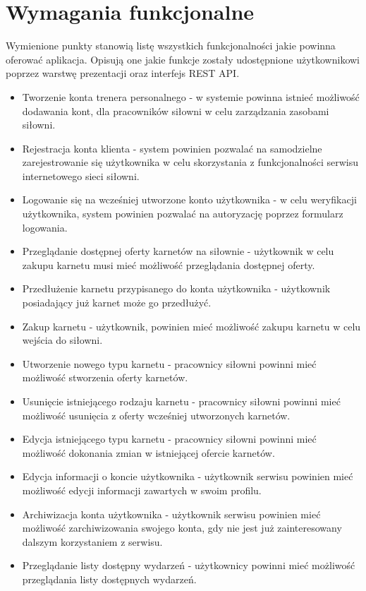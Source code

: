 \documentclass[a4paper,twoside,12pt]{book}
\begin{document}
	\section{Wymagania funkcjonalne} 
	Wymienione punkty stanowią listę wszystkich funkcjonalności jakie powinna oferować aplikacja. Opisują one jakie funkcje  zostały udostępnione użytkownikowi poprzez warstwę prezentacji oraz interfejs REST API.
		\begin{itemize}
			\item Tworzenie konta trenera personalnego - w systemie powinna istnieć możliwość dodawania kont, dla pracowników siłowni w celu zarządzania zasobami siłowni.
			\item Rejestracja konta klienta - system powinien pozwalać na samodzielne zarejestrowanie się użytkownika w celu skorzystania z funkcjonalności serwisu internetowego sieci siłowni.
			\item Logowanie się na wcześniej utworzone konto użytkownika - w celu weryfikacji użytkownika, system powinien pozwalać na autoryzację poprzez formularz logowania.
			\item Przeglądanie dostępnej oferty karnetów na siłownie - użytkownik w celu zakupu karnetu musi mieć możliwość przeglądania dostępnej oferty.
			\item Przedłużenie karnetu przypisanego do konta użytkownika - użytkownik posiadający już karnet może go przedłużyć.
			\item Zakup karnetu - użytkownik, powinien mieć możliwość zakupu karnetu w celu wejścia do siłowni.
			\item Utworzenie nowego typu karnetu - pracownicy siłowni powinni mieć możliwość stworzenia oferty karnetów.
			\item Usunięcie istniejącego rodzaju karnetu - pracownicy siłowni powinni mieć możliwość usunięcia z oferty wcześniej utworzonych karnetów.
			\item Edycja istniejącego typu karnetu - pracownicy siłowni powinni mieć możliwość dokonania zmian w istniejącej ofercie karnetów.
			\item Edycja informacji o koncie użytkownika - użytkownik serwisu powinien mieć możliwość edycji informacji zawartych w swoim profilu.
			\item Archiwizacja konta użytkownika - użytkownik serwisu powinien mieć możliwość zarchiwizowania swojego konta, gdy nie jest już zainteresowany dalszym korzystaniem z serwisu.
			\item Przeglądanie listy dostępny wydarzeń - użytkownicy powinni mieć możliwość przeglądania listy dostępnych wydarzeń.

\end{itemize}
\end{document}
